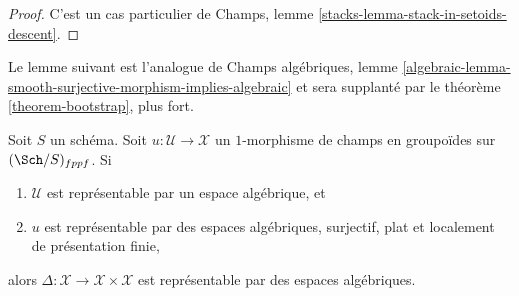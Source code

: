\begin{proof}
C'est un cas particulier de
Champs, lemme \ref{stacks-lemma-stack-in-setoids-descent}.
\end{proof}

\noindent
Le lemme suivant est l'analogue de
Champs algébriques, lemme
\ref{algebraic-lemma-smooth-surjective-morphism-implies-algebraic}
et sera supplanté par le
théorème \ref{theorem-bootstrap}, plus fort.

\begin{lemma}
\label{lemma-flat-finite-presentation-surjective-diagonal}
Soit $S$ un schéma.
Soit $u : \mathcal{U} \to \mathcal{X}$ un $1$-morphisme de
champs en groupoïdes sur $(\Sch/S)_{fppf}$. Si
\begin{enumerate}
\item $\mathcal{U}$ est représentable par un espace algébrique, et
\item $u$ est représentable par des espaces algébriques, surjectif, plat et
localement de présentation finie,
\end{enumerate}
alors
$\Delta : \mathcal{X} \to \mathcal{X} \times \mathcal{X}$
est représentable par des espaces algébriques.
\end{lemma}

